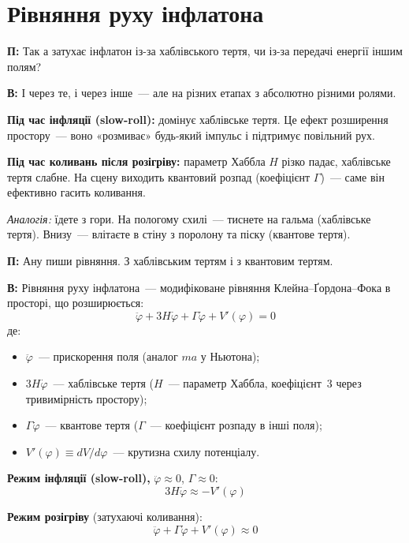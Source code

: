 \documentclass[12pt, a4paper]{article}
\newcommand{\Q}[1]{%
    \begin{questionbox}
        {\color{qcolor}\bfseries\sffamily П:} #1
    \end{questionbox}
}
\newcommand{\A}[1]{%
    \begin{answerbox}
        {\bfseries\sffamily В:} #1
    \end{answerbox}
}
\begin{document}
\section{Рівняння руху інфлатона}

\Q{Так а затухає інфлатон із-за хаблівського тертя, чи із-за передачі енергії іншим полям?}

\A{І через те, і через інше~--- але на різних етапах з абсолютно різними ролями.

\textbf{Під час інфляції (slow-roll):} домінує хаблівське тертя. Це ефект розширення простору~--- воно «розмиває» будь-який імпульс і підтримує повільний рух.

\textbf{Під час коливань після розігріву:} параметр Хаббла $H$ різко падає, хаблівське тертя слабне. На сцену виходить квантовий розпад (коефіцієнт $\Gamma$)~--- саме він ефективно гасить коливання.

\textit{Аналогія:} їдете з гори. На пологому схилі~--- тиснете на гальма (хаблівське тертя). Внизу~--- влітаєте в стіну з поролону та піску (квантове тертя).}


\Q{Ану пиши рівняння. З хаблівським тертям і з квантовим тертям.}

\A{Рівняння руху інфлатона~--- модифіковане рівняння Клейна--Ґордона--Фока в просторі, що розширюється:
\begin{equation}
    \ddot{\varphi} + 3H\dot{\varphi} + \Gamma\dot{\varphi} + V'(\varphi) = 0
    \label{eq:inflaton}
\end{equation}
де:
\begin{itemize}[noitemsep]
    \item $\ddot{\varphi}$~--- прискорення поля (аналог $ma$ у Ньютона);
    \item $3H\dot{\varphi}$~--- хаблівське тертя ($H$~--- параметр Хаббла, коефіцієнт~3 через тривимірність простору);
    \item $\Gamma\dot{\varphi}$~--- квантове тертя ($\Gamma$~--- коефіцієнт розпаду в інші поля);
    \item $V'(\varphi) \equiv dV/d\varphi$~--- крутизна схилу потенціалу.
\end{itemize}

\textbf{Режим інфляції (slow-roll),} $\ddot{\varphi}\approx0$, $\Gamma\approx0$:
\begin{equation}
    3H\dot{\varphi} \approx -V'(\varphi)
\end{equation}

\textbf{Режим розігріву} (затухаючі коливання):
\begin{equation}
    \ddot{\varphi} + \Gamma\dot{\varphi} + V'(\varphi) \approx 0
\end{equation}}
\end{document}
